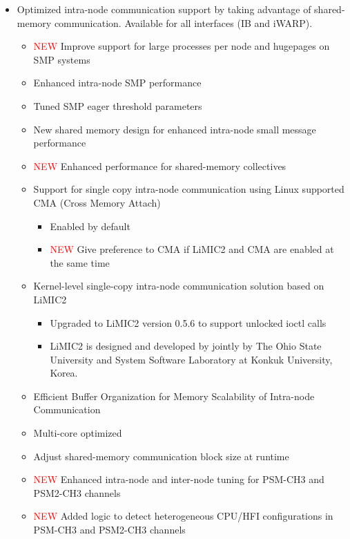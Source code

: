 \begin{itemize}
\begin{itemize}
      \end{itemize}
  \item 
    Optimized intra-node communication support by taking advantage of
    shared-memory communication.  Available for all interfaces 
    (IB and iWARP).  
    \begin{itemize}
      \item \textcolor{red}{NEW}  Improve support for large processes per node
          and hugepages on SMP systems
      \item  Enhanced intra-node SMP performance
      \item  Tuned SMP eager threshold parameters
      \item  New shared memory design for enhanced intra-node small message performance
      \item  \textcolor{red}{NEW} Enhanced performance for shared-memory collectives
      \item  Support for single copy intra-node communication using Linux supported CMA (Cross Memory Attach)
          \begin{itemize}
            \item  Enabled by default
	    \item \textcolor{red}{NEW} Give preference to CMA if LiMIC2 and CMA are enabled at the same time
          \end{itemize}
      \item  Kernel-level single-copy 
           intra-node communication solution based on LiMIC2
           \begin{itemize}
            \item  Upgraded to LiMIC2 version 0.5.6 to support unlocked ioctl calls
            \item  LiMIC2 is designed and developed by jointly by The Ohio State University and System Software Laboratory at Konkuk University, Korea.
           \end{itemize}
      \item  Efficient Buffer Organization for Memory Scalability of 
           Intra-node Communication 
      \item  Multi-core optimized
      \item  Adjust shared-memory communication block size at runtime
      \item \textcolor{red}{NEW} Enhanced intra-node and inter-node tuning for PSM-CH3 and PSM2-CH3 channels
      \item \textcolor{red}{NEW} Added logic to detect heterogeneous CPU/HFI configurations in PSM-CH3 and PSM2-CH3 channels

\end{itemize}
\end{itemize}
